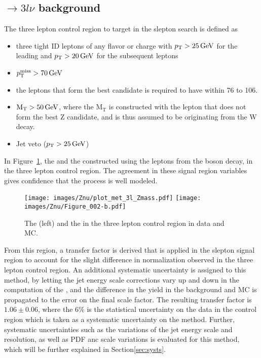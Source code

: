 \subsection*{\PWZ$\rightarrow3l\nu$ background}
\noindent
\justify
The three lepton control region to target \PWZ in the slepton search is defined as
\begin{itemize}
    \item three tight ID leptons of any flavor or charge with $p_{\mathrm{T}}>25\,\text{Ge\hspace{-.08em}V}$ for the leading and $p_{\mathrm{T}}>20\,\text{Ge\hspace{-.08em}V}$ for the subsequent leptons
    \item $p_{\mathrm{T}}^\text{miss}>70\,\text{Ge\hspace{-.08em}V}$
    \item the leptons that form the best \PZ candidate is required to have \mll within 76 to 106\GeV.
    \item $\mathrm{M_{T}}>50\,\text{Ge\hspace{-.08em}V}$, where the $\mathrm{M_{T}}$ is constructed with the lepton that does not form the best Z candidate, and is thus assumed to be originating from the W decay.
    \item Jet veto ($p_{\mathrm{T}}>25\,\text{Ge\hspace{-.08em}V}$)
\end{itemize}
\newpara
\noindent\justify
In Figure~\ref{fig:WZmet}, the \ptmiss and the \mttwo constructed using the leptons from the \PZ boson decay, in the three lepton control region.
The agreement in these signal region variables gives confidence that the \PWZ process is well modeled.
\begin{figure}[htbp!]
\begin{center}
\texttt{[image: images/Znu/plot\_met\_3l\_Zmass.pdf]}
\texttt{[image: images/Znu/Figure\_002-b.pdf]}
\caption{The \ptmiss (left) and the \mttwo in the three lepton control region in data and MC. }
\label{fig:WZmet}
\end{center}
\end{figure}
From this region, a transfer factor is derived that is applied in the slepton signal region to account for the slight difference in normalization observed in the three lepton control region.
An additional systematic uncertainty is assigned to this method, by letting the jet energy scale corrections vary up and down in the computation of the \ptmiss, and the difference in the yield in the     background and \PWZ MC is propagated to the error on the final scale factor.
The resulting transfer factor is $1.06\pm0.06$, where the 6\% is the statistical uncertainty on the data in the control region which is taken as a systematic uncertainty on the method.
Further, systematic uncertainties such as the variations of the jet energy scale and resolution, as well as PDF anc scale variations is evaluated for this method, which will be further explained in Section\ref{sec:systs}.
